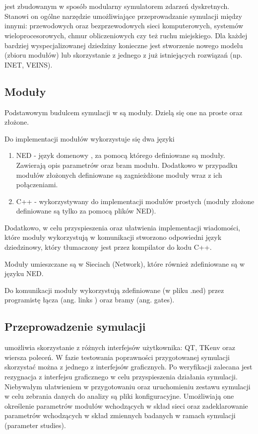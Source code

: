 \section{\omnetpp}
\omnetpp jest zbudowanym w sposób modularny symulatorem zdarzeń dyskretnych. Stanowi on ogólne narzędzie umożliwiające przeprowadzanie symulacji między innymi: przewodowych oraz bezprzewodowych sieci komputerowych, systemów wieloprocesorowych, chmur obliczeniowych czy też ruchu miejskiego. Dla każdej bardziej wyspecjalizowanej dziedziny konieczne jest stworzenie nowego modelu (zbioru modułów) lub skorzystanie z jednego z już istniejących rozwiązań (np. INET, VEINS).\cite{Varga2017}
\subsection{Moduły}
Podstawowym budulcem symulacji w \omnetpp są moduły. Dzielą się one na proste oraz złożone.

Do implementacji modułów wykorzystuje się dwa języki
\begin{enumerate}
	\item NED - język domenowy \omnetpp, za pomocą którego definiowane są moduły. Zawierają opis parametrów oraz bram modułu. Dodatkowo w przypadku modułów złożonych definiowane są zagnieżdżone moduły wraz z ich połączeniami.
	\item C++ - wykorzystywany do implementacji modułów prostych (moduły złożone definiowane są tylko za pomocą plików NED).
\end{enumerate}
Dodatkowo, w celu przyspieszenia oraz ułatwienia implementacji wiadomości, które moduły wykorzystują w komunikacji stworzono odpowiedni język dziedzinowy, który tłumaczony jest przez kompilator do kodu C++.

Moduły umieszczane są w Sieciach (Network), które również zdefiniowane są w języku NED.

Do komunikacji moduły wykorzystują zdefiniowane (w pliku .ned) przez programistę łącza (ang. links ) oraz bramy (ang. gates).
\subsection{Przeprowadzenie symulacji}
\omnetpp umożliwia skorzystanie z różnych interfejsów użytkownika: QT, TKenv oraz wiersza poleceń. W fazie testowania poprawności przygotowanej symulacji skorzystać można z jednego z interfejsów graficznych. Po weryfikacji zalecana jest rezygnacja z interfejsu graficznego w celu przyspieszenia działania symulacji. Niebywałym ułatwieniem w przygotowaniu oraz uruchomieniu zestawu symulacji w celu zebrania danych do analizy są pliki konfiguracyjne. Umożliwiają one określenie parametrów modułów wchodzących w skład sieci oraz zadeklarowanie parametrów wchodzących w skład zmiennych badanych w ramach symulacji (parameter studies).
